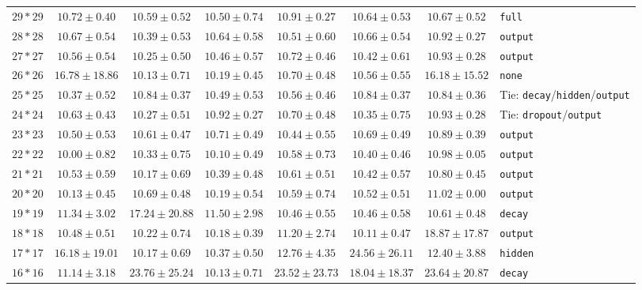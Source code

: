 \documentclass[conference]{IEEEtran}
\begin{document}
\begin{longtable}{@{}lccccccl@{}}
$29*29$ & $10.72 \pm 0.40$ & $10.59 \pm 0.52$ & $10.50 \pm 0.74$ & \bfseries $10.91 \pm 0.27$ & $10.64 \pm 0.53$ & $10.67 \pm 0.52$ & \texttt{full} \\
$28*28$ & $10.67 \pm 0.54$ & $10.39 \pm 0.53$ & $10.64 \pm 0.58$ & $10.51 \pm 0.60$ & $10.66 \pm 0.54$ & \bfseries $10.92 \pm 0.27$ & \texttt{output} \\
$27*27$ & $10.56 \pm 0.54$ & $10.25 \pm 0.50$ & $10.46 \pm 0.57$ & $10.72 \pm 0.46$ & $10.42 \pm 0.61$ & \bfseries $10.93 \pm 0.28$ & \texttt{output} \\
$26*26$ & \bfseries $16.78 \pm 18.86$ & $10.13 \pm 0.71$ & $10.19 \pm 0.45$ & $10.70 \pm 0.48$ & $10.56 \pm 0.55$ & $16.18 \pm 15.52$ & \texttt{none} \\
$25*25$ & $10.37 \pm 0.52$ & \bfseries $10.84 \pm 0.37$ & $10.49 \pm 0.53$ & $10.56 \pm 0.46$ & \bfseries $10.84 \pm 0.37$ & \bfseries $10.84 \pm 0.36$ & Tie: \texttt{decay}/\texttt{hidden}/\texttt{output} \\
$24*24$ & $10.63 \pm 0.43$ & $10.27 \pm 0.51$ & \bfseries $10.92 \pm 0.27$ & $10.70 \pm 0.48$ & $10.35 \pm 0.75$ & \bfseries $10.93 \pm 0.28$ & Tie: \texttt{dropout}/\texttt{output} \\
$23*23$ & $10.50 \pm 0.53$ & $10.61 \pm 0.47$ & $10.71 \pm 0.49$ & $10.44 \pm 0.55$ & $10.69 \pm 0.49$ & \bfseries $10.89 \pm 0.39$ & \texttt{output} \\
$22*22$ & $10.00 \pm 0.82$ & $10.33 \pm 0.75$ & $10.10 \pm 0.49$ & $10.58 \pm 0.73$ & $10.40 \pm 0.46$ & \bfseries $10.98 \pm 0.05$ & \texttt{output} \\
$21*21$ & $10.53 \pm 0.59$ & $10.17 \pm 0.69$ & $10.39 \pm 0.48$ & $10.61 \pm 0.51$ & $10.42 \pm 0.57$ & \bfseries $10.80 \pm 0.45$ & \texttt{output} \\
$20*20$ & $10.13 \pm 0.45$ & $10.69 \pm 0.48$ & $10.19 \pm 0.54$ & $10.59 \pm 0.74$ & $10.52 \pm 0.51$ & \bfseries $11.02 \pm 0.00$ & \texttt{output} \\
$19*19$ & $11.34 \pm 3.02$ & \bfseries $17.24 \pm 20.88$ & $11.50 \pm 2.98$ & $10.46 \pm 0.55$ & $10.46 \pm 0.58$ & $10.61 \pm 0.48$ & \texttt{decay} \\
$18*18$ & $10.48 \pm 0.51$ & $10.22 \pm 0.74$ & $10.18 \pm 0.39$ & $11.20 \pm 2.74$ & $10.11 \pm 0.47$ & \bfseries $18.87 \pm 17.87$ & \texttt{output} \\
$17*17$ & $16.18 \pm 19.01$ & $10.17 \pm 0.69$ & $10.37 \pm 0.50$ & $12.76 \pm 4.35$ & \bfseries $24.56 \pm 26.11$ & $12.40 \pm 3.88$ & \texttt{hidden} \\
$16*16$ & $11.14 \pm 3.18$ & \bfseries $23.76 \pm 25.24$ & $10.13 \pm 0.71$ & $23.52 \pm 23.73$ & $18.04 \pm 18.37$ & $23.64 \pm 20.87$ & \texttt{decay} \\

\end{longtable}
\end{document}
